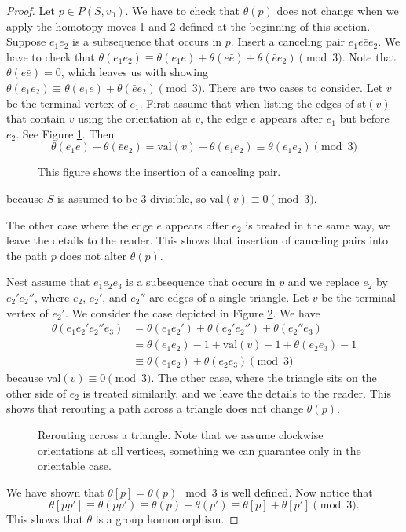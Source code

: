 \documentclass[10pt,a4paper]{amsart}
\begin{document}
\begin{proof} 
    Let $p\in P(S,v_0)$. We have to check that $\theta(p)$ does not change when we apply the homotopy moves 1 and 2 defined at the beginning of this section. Suppose $e_1e_2$ is a subsequence that occurs in $p$. Insert a canceling pair $e_1e\bar ee_2$. We have to check that $\theta(e_1e_2)\equiv\theta(e_1e)+\theta(e\bar e)+\theta(\bar e e_2)\pmod3$. Note that $\theta(e\bar e)=0$, which leaves us with showing $\theta(e_1e_2)\equiv\theta(e_1e)+\theta(\bar e e_2)\pmod3$. There are two cases to consider. Let $v$ be the terminal vertex of $e_1$. First assume that when listing the edges of st$(v)$ that contain $v$ using the orientation at $v$, the edge $e$ appears after $e_1$ but before $e_2$. See Figure \ref{canceling_figure}.
    Then
    $$\theta(e_1e)+\theta(\bar e e_2)=\text{val}(v)+\theta(e_1e_2)\equiv \theta(e_1e_2) \pmod3$$
    \begin{figure}[h!]
        \centering
        
        \caption{This figure shows the insertion of a canceling pair.}
        \label{canceling_figure}
    \end{figure}
    because $S$ is assumed to be 3-divisible, so val$(v)\equiv0\pmod3$. 
    
    \noindent The other case where the edge $e$ appears after $e_2$ is treated in the same way, we leave the details to the reader. This shows that insertion of canceling pairs into the path $p$ does not alter $\theta(p)$.
    
    Nest assume that $e_1e_2e_3$ is a subsequence that occurs in $p$ and we replace $e_2$ by $e_2'e_2''$, where $e_2$, $e_2'$, and $e_2''$ are edges of a single triangle. Let $v$ be the terminal vertex of $e_2'$. We consider the case depicted in Figure \ref{rerouting_figure}. 
    We have 
    \begin{align*}
        \theta(e_1e_2'e_2''e_3) &=\theta(e_1e_2')+\theta(e_2'e_2'')+\theta(e_2''e_3) \\
        &=\theta(e_1e_2)-1+\text{val}(v)-1+\theta(e_2e_3)-1 \\
        &\equiv\theta(e_1e_2)+\theta(e_2e_3)\pmod3
    \end{align*}
    because val$(v)\equiv0\pmod3$. The other case, where the triangle sits on the other side of $e_2$ is treated similarily, and we leave the details to the reader. This shows that rerouting a path across a triangle does not change $\theta(p)$.
    
    \begin{figure}[h]
        \centering
        
        \caption{Rerouting across a triangle. Note that we assume clockwise orientations at all vertices, something we can guarantee only in the orientable case.}
        \label{rerouting_figure}
    \end{figure}
    
    We have shown that $\theta[p]=\theta(p)\mod3$ is well defined. Now notice that 
    $$\theta[pp']\equiv\theta(pp')\equiv\theta(p)+\theta(p')\equiv\theta[p]+\theta[p']\pmod3.$$
    This shows that $\theta$ is a group homomorphism.
\end{proof}
\end{document}
